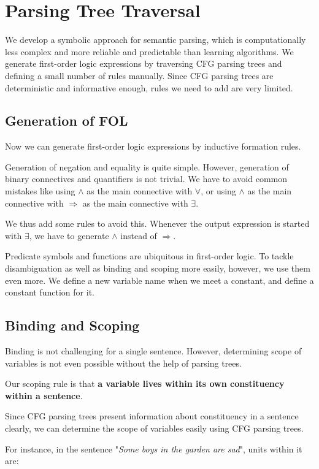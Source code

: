 \documentclass{article}
\begin{document}
\section{Parsing Tree Traversal}{
	We develop a symbolic approach for semantic parsing, which is computationally less complex and more reliable and predictable than learning algorithms. We generate first-order logic expressions by traversing CFG parsing trees and defining a small number of rules manually. Since CFG parsing trees are deterministic and informative enough, rules we need to add are very limited. 

	\subsection{Generation of FOL}{
		Now we can generate first-order logic expressions by inductive formation rules. 

		Generation of negation and equality is quite simple. However, generation of binary connectives and quantifiers is not trivial. We have to avoid common mistakes like using $\wedge $ as the main connective with $\forall $, or using $\wedge $ as the main connective with $\Rightarrow $ as the main connective with $\exists $. 

		We thus add some rules to avoid this. Whenever the output expression is started with $\exists $, we have to generate $\wedge $ instead of $\Rightarrow$. 

		Predicate symbols and functions are ubiquitous in first-order logic. To tackle disambiguation as well as binding and scoping more easily, however, we use them even more. We define a new variable name when we meet a constant, and define a constant function for it. 
	}

	\subsection{Binding and Scoping}{
		Binding is not challenging for a single sentence. However, determining scope of variables is not even possible without the help of parsing trees. 

		Our scoping rule is that \textbf{a variable lives within its own constituency within a sentence}. 

		Since CFG parsing trees present information about constituency in a sentence clearly, we can determine the scope of variables easily using CFG parsing trees. 

		For instance, in the sentence "\emph{Some boys in the garden are sad}", units within it are: 

}}
\end{document}
